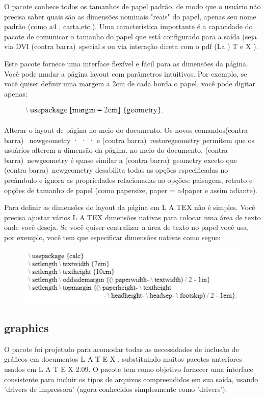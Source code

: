 \documentclass[12pt]{article}
\begin{document}
			O pacote conhece todos os tamanhos de papel padrão, de modo que o usuário não precisa saber quais são as dimensões nominais "reais" do papel, apenas seu nome padrão (como a4 , carta,etc.).
			Uma característica importante é a capacidade do pacote de comunicar o tamanho do papel que está configurado para a saída (seja via DVI (contra barra)\ special s ou via interação direta com o pdf (La ) T e X ).
			
			Este pacote fornece uma interface flexível e fácil para as dimensões da página. Você pode mudar a página layout com parâmetros intuitivos. Por exemplo, se você quiser definir uma margem a 2cm de cada borda o papel, você pode digitar apenas:
			\begin{figure}[!htb]
				\centering
				\includegraphics[scale=1.1]{17.JPG}
			\end{figure}
			
			
			Alterar o layout de página no meio do documento. Os novos comandos(contra barra) \ newgeometry {· · ·} e (contra barra)\ restoregeometry permitem que os usuários alterem a dimensão da página. no meio do documento. (contra barra)\ newgeometry é quase similar a (contra barra)\ geometry exceto que (contra barra)\ newgeometry desabilita todas as opções especificadas no preâmbulo e ignora as propriedades relacionadas ao opções: paisagem, retrato e opções de tamanho de papel (como papersize, paper = a4paper e assim adiante).
			
			Para definir as dimensões do layout da página em L A TEX não é simples. Você precisa ajustar vários L A TEX dimensões nativas para colocar uma área de texto onde você deseja. Se você quiser centralizar a área de texto no papel você usa, por exemplo, você tem que especificar dimensões nativas como segue:
			\begin{figure}[!htb]
				\centering
				\includegraphics[scale=1.1]{16.JPG}
			\end{figure}
		
		\subsection{graphics}
			O pacote foi projetado para acomodar todas as necessidades de inclusão de gráficos em documentos L A T E X , substituindo muitos pacotes anteriores usados em L A T E X 2.09. O pacote tem como objetivo fornecer uma interface consistente para incluir os tipos de arquivos compreendidos em sua saída, usando 'drivers de impressora' (agora conhecidos simplesmente como 'drivers'). 
			
\end{document}
